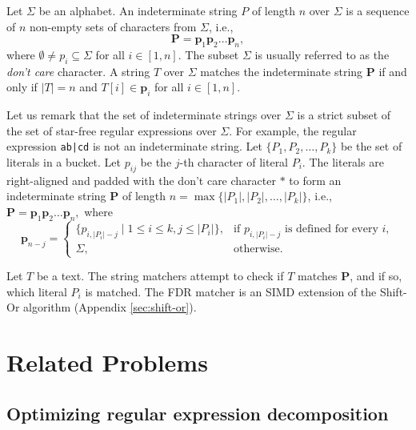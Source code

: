 \begin{definition}
  Let $\Sigma$ be an alphabet. An indeterminate string $P$ of length $n$ over $\Sigma$ is a sequence of $n$ non-empty sets of characters from $\Sigma$, i.e.,
  $$\bm{P} = \bm{p}_1  \bm{p}_2  \ldots \bm{p}_{n},$$
  where $\emptyset \neq p_i \subseteq \Sigma$ for all $i \in [1, n]$. The subset $\Sigma$ is usually referred to as the \textit{don't care} character. A string $T$ over $\Sigma$ matches the indeterminate string $\bm{P}$ if and only if $|T| = n$ and $T[i] \in \bm{p}_i$ for all $i \in [1, n]$.
\end{definition}

Let us remark that the set of indeterminate strings over $\Sigma$ is a strict subset of the set of star-free regular expressions over $\Sigma$. For example, the regular expression \texttt{ab|cd} is not an indeterminate string. Let $\{P_1, P_2, \ldots, P_k\}$ be the set of literals in a bucket. Let $p_{ij}$ be the $j$-th character of literal $P_i$. The literals are right-aligned and padded with the don't care character $*$ to form an indeterminate string $\bm{P}$ of length $n = \max\{|P_1|, |P_2|, \ldots, |P_k|\}$, i.e., $\bm{P} = \bm{p}_1  \bm{p}_2  \ldots \bm{p}_{n},$ where
$$\bm{p}_{n-j}=
  \begin{cases}
    \{p_{i, |P_i|-j} \mid 1 \le i \le k, j \le |P_i|\}, & \text{if $p_{i, |P_i|-j}$ is defined for every $i$}, \\
    \Sigma,                                             & \text{otherwise}.
  \end{cases}
$$

Let $T$ be a text. The string matchers attempt to check if $T$ matches $\bm{P}$, and if so, which literal $P_i$ is matched. The FDR matcher is an SIMD extension of the Shift-Or algorithm (Appendix \ref{sec:shift-or}).



\section{Related Problems}


\subsection{Optimizing regular expression decomposition}

